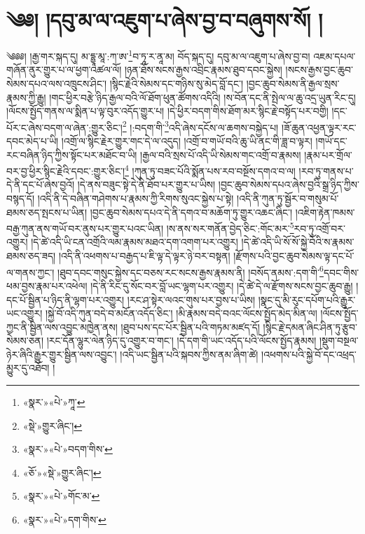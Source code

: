 \chapter{༄༅། །དབུ་མ་ལ་འཇུག་པ་ཞེས་བྱ་བ་བཞུགས་སོ། །}༄༅༅། །རྒྱ་གར་སྐད་དུ། མ་དྷྱཱ་མཱ་:ཀ་ཨ་\footnote{«སྣར་»«པེ་»ཀཱ་}བ་ཏཱ་ར་ནཱ་མ། བོད་སྐད་དུ། དབུ་མ་ལ་འཇུག་པ་ཞེས་བྱ་བ། འཇམ་དཔལ་གཞོན་ནུར་གྱུར་པ་ལ་ཕྱག་འཚལ་ལོ། །ཉན་ཐོས་སངས་རྒྱས་འབྲིང་རྣམས་ཐུབ་དབང་སྐྱེས། །སངས་རྒྱས་བྱང་ཆུབ་སེམས་དཔའ་ལས་འཁྲུངས་ཤིང་། །སྙིང་རྗེའི་སེམས་དང་གཉིས་སུ་མེད་བློ་དང་། །བྱང་ཆུབ་སེམས་ནི་རྒྱལ་སྲས་རྣམས་ཀྱི་རྒྱུ། །གང་ཕྱིར་བརྩེ་ཉིད་རྒྱལ་བའི་ལོ་ཐོག་ཕུན་ཚོགས་འདིའི། །ས་བོན་དང་ནི་སྤེལ་ལ་ཆུ་འདྲ་ཡུན་རིང་དུ། །ལོངས་སྤྱོད་གནས་ལ་སྨིན་པ་ལྟ་བུར་འདོད་གྱུར་པ། །དེ་ཕྱིར་བདག་གིས་ཐོག་མར་སྙིང་རྗེ་བསྟོད་པར་བགྱི། །དང་པོར་ང་ཞེས་བདག་ལ་ཞེན་:གྱུར་ཅིང་།\footnote{«སྡེ་»གྱུར་ཞིང་།} །:བདག་གི་\footnote{«སྣར་»«པེ་»བདག་གིས་}འདི་ཞེས་དངོས་ལ་ཆགས་བསྐྱེད་པ། །ཟོ་ཆུན་འཕྱན་ལྟར་རང་དབང་མེད་པ་ཡི། །འགྲོ་ལ་སྙིང་རྗེར་གྱུར་གང་དེ་ལ་འདུད། །འགྲོ་བ་གཡོ་བའི་ཆུ་ཡི་ནང་གི་ཟླ་བ་ལྟར། །གཡོ་དང་རང་བཞིན་ཉིད་ཀྱིས་སྟོང་པར་མཐོང་བ་ཡི། །རྒྱལ་བའི་སྲས་པོ་འདི་ཡི་སེམས་གང་འགྲོ་བ་རྣམས། །རྣམ་པར་གྲོལ་བར་བྱ་ཕྱིར་སྙིང་རྗེའི་དབང་:གྱུར་ཅིང་།\footnote{«ཅོ་»«སྡེ་»གྱུར་ཞིང་།} །ཀུན་ཏུ་བཟང་པོའི་སྨོན་པས་རབ་བསྔོས་དགའ་བ་ལ། །རབ་ཏུ་གནས་པ་དེ་ནི་དང་པོ་ཞེས་བྱའོ། །དེ་ནས་བཟུང་སྟེ་དེ་ནི་ཐོབ་པར་གྱུར་པ་ཡིས། །བྱང་ཆུབ་སེམས་དཔའ་ཞེས་བྱའི་སྒྲ་ཉིད་ཀྱིས་བསྙད་དོ། །འདི་ནི་དེ་བཞིན་གཤེགས་པ་རྣམས་ཀྱི་རིགས་སུའང་སྐྱེས་པ་སྟེ། །འདི་ནི་ཀུན་ཏུ་སྦྱོར་བ་གསུམ་པོ་ཐམས་ཅད་སྤངས་པ་ཡིན། །བྱང་ཆུབ་སེམས་དཔའ་དེ་ནི་དགའ་བ་མཆོག་ཏུ་གྱུར་འཆང་ཞིང་། །འཇིག་རྟེན་ཁམས་བརྒྱ་ཀུན་ནས་གཡོ་བར་ནུས་པར་གྱུར་པའང་ཡིན། །ས་ནས་སར་གནོན་བྱེད་ཅིང་:གོང་མར་\footnote{«སྣར་»«པེ་»གོང་མ་}རབ་ཏུ་འགྲོ་བར་འགྱུར། །དེ་ཚེ་འདི་ཡི་ངན་འགྲོའི་ལམ་རྣམས་མཐའ་དག་འགག་པར་འགྱུར། །དེ་ཚེ་འདི་ཡི་སོ་སོ་སྐྱེ་བོའི་ས་རྣམས་ཐམས་ཅད་ཟད། །འདི་ནི་འཕགས་པ་བརྒྱད་པ་ཇི་ལྟ་དེ་ལྟར་ཉེ་བར་བསྟན། །རྫོགས་པའི་བྱང་ཆུབ་སེམས་ལྟ་དང་པོ་ལ་གནས་ཀྱང་། །ཐུབ་དབང་གསུང་སྐྱེས་དང་བཅས་རང་སངས་རྒྱས་རྣམས་ནི། །བསོད་ནམས་:དག་གི་\footnote{«སྣར་»«པེ་»དག་གིས་}དབང་གིས་ཕམ་བྱས་རྣམ་པར་འཕེལ། །དེ་ནི་རིང་དུ་སོང་བར་བློ་ཡང་ལྷག་པར་འགྱུར། །དེ་ཚེ་དེ་ལ་རྫོགས་སངས་བྱང་ཆུབ་རྒྱུ། །དང་པོ་སྦྱིན་པ་ཉིད་ནི་ལྷག་པར་འགྱུར། །རང་ཤ་སྟེར་ལའང་གུས་པར་བྱས་པ་ཡིས། །སྣང་དུ་མི་རུང་དཔོག་པའི་རྒྱུར་ཡང་འགྱུར། །སྐྱེ་བོ་འདི་ཀུན་བདེ་བ་མངོན་འདོད་ཅིང་། །མི་རྣམས་བདེ་བའང་ལོངས་སྤྱོད་མེད་མིན་ལ། །ལོངས་སྤྱོད་ཀྱང་ནི་སྦྱིན་ལས་འབྱུང་མཁྱེན་ནས། །ཐུབ་པས་དང་པོར་སྦྱིན་པའི་གཏམ་མཛད་དོ། །སྙིང་རྗེ་དམན་ཞིང་ཤིན་ཏུ་རྩུབ་སེམས་ཅན། །རང་དོན་ལྷུར་ལེན་ཉིད་དུ་འགྱུར་བ་གང་། །དེ་དག་གི་ཡང་འདོད་པའི་ལོངས་སྤྱོད་རྣམས། །སྡུག་བསྔལ་ཉེར་ཞིའི་རྒྱུར་གྱུར་སྦྱིན་ལས་འབྱུང་། །འདི་ཡང་སྦྱིན་པའི་སྐབས་ཀྱིས་ནམ་ཞིག་ཚེ། །འཕགས་པའི་སྐྱེ་བོ་དང་འཕྲད་མྱུར་དུ་འཐོབ། །
